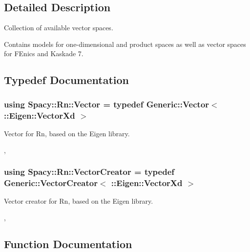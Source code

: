 \subsection{Detailed Description}
Collection of available vector spaces. 

Contains models for one-\/dimensional and product spaces as well as vector spaces for F\+Enics and Kaskade 7. 

\subsection{Typedef Documentation}
\hypertarget{group__VectorSpaceGroup_gafda42fd5aa3f7597a42b9831bf4dfd07}{}
\subsubsection[{Vector}]{\setlength{\rightskip}{0pt plus 5cm}using {\bf Spacy\+::\+Rn\+::\+Vector} = typedef Generic\+::\+Vector$<$ \+::Eigen\+::\+Vector\+Xd $>$}\label{group__VectorSpaceGroup_gafda42fd5aa3f7597a42b9831bf4dfd07}


Vector for Rn, based on the Eigen library. 

, \hypertarget{group__VectorSpaceGroup_gab3b27cb653ec69d12c809394126b046a}{}
\subsubsection[{Vector\+Creator}]{\setlength{\rightskip}{0pt plus 5cm}using {\bf Spacy\+::\+Rn\+::\+Vector\+Creator} = typedef Generic\+::\+Vector\+Creator$<$ \+::Eigen\+::\+Vector\+Xd $>$}\label{group__VectorSpaceGroup_gab3b27cb653ec69d12c809394126b046a}


Vector creator for Rn, based on the Eigen library. 

, 

\subsection{Function Documentation}
\hypertarget{group__VectorSpaceGroup_ga89de372343310640870077e6167df3f4}{}
